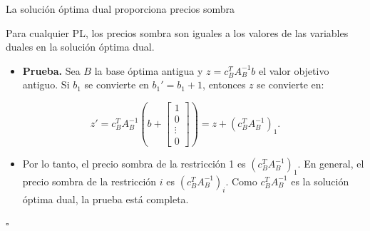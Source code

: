 \documentclass{beamer}
\begin{document}
\begin{frame}{La solución óptima dual proporciona precios sombra}
    \begin{block}{}
        Para cualquier PL, los precios sombra son iguales a los valores de las variables duales en la solución óptima dual.
    \end{block}

    \begin{itemize}
        \item \textbf{Prueba.} Sea \( B \) la base óptima antigua y \( z = c_B^T A_B^{-1} b \) el valor objetivo antiguo. Si \( b_1 \) se convierte en \( b_1' = b_1 + 1 \), entonces \( z \) se convierte en:
    \end{itemize}
    
    \[
    z' = c_B^T A_B^{-1} \left( b + 
    \begin{bmatrix}
        1 \\
        0 \\
        \vdots \\
        0
    \end{bmatrix} \right) 
    = z + \left( c_B^T A_B^{-1} \right)_1.
    \]

    \begin{itemize}
        \item Por lo tanto, el precio sombra de la restricción 1 es \( \left( c_B^T A_B^{-1} \right)_1 \). En general, el precio sombra de la restricción \( i \) es \( \left( c_B^T A_B^{-1} \right)_i \). Como \( c_B^T A_B^{-1} \) es la solución óptima dual, la prueba está completa.
    \end{itemize}
    
    \begin{flushright}
        \(\square\)
    \end{flushright}
\end{frame}
\end{document}

